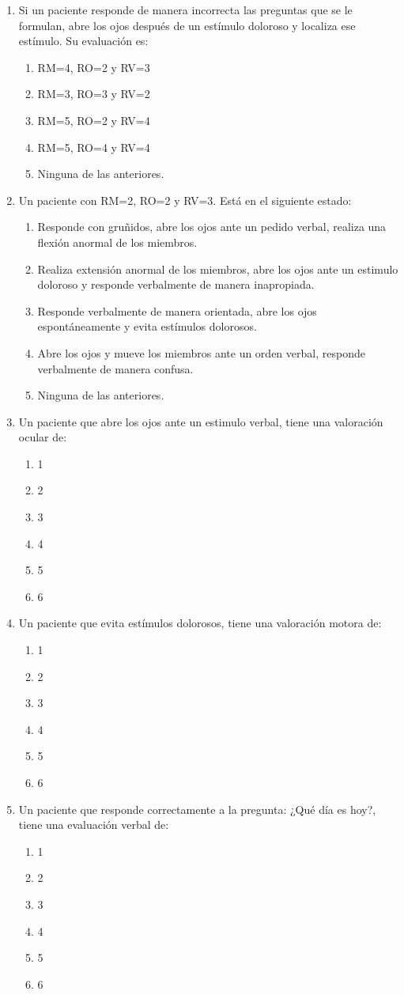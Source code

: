 \begin{enumerate}[label=\bfseries OG\arabic*.:]
\item Si un paciente responde de manera incorrecta las preguntas que se le
    formulan, abre los ojos después de un estímulo doloroso y localiza ese
    estímulo. Su evaluación es:
\begin{enumerate}
 \item RM=4, RO=2 y RV=3
 \item RM=3, RO=3 y RV=2
 \item RM=5, RO=2 y RV=4
 \item RM=5, RO=4 y RV=4
 \item Ninguna de las anteriores.
\end{enumerate}

\item Un paciente con RM=2, RO=2 y RV=3. Está en el siguiente estado:
\begin{enumerate}
 \item Responde con gruñidos, abre los ojos ante un pedido verbal, realiza una
     flexión anormal de los miembros.
 \item Realiza extensión anormal de los miembros, abre los ojos ante un estimulo
     doloroso y responde verbalmente de manera inapropiada.
 \item Responde verbalmente de manera orientada, abre los ojos espontáneamente y
     evita estímulos dolorosos.
 \item Abre los ojos y mueve los miembros ante un orden verbal, responde
     verbalmente de manera confusa.
 \item Ninguna de las anteriores.
\end{enumerate}
\item Un paciente que abre los ojos ante un estimulo verbal, tiene una
    valoración ocular de:
\begin{enumerate}
 \item 1
 \item 2
 \item 3
 \item 4
 \item 5
 \item 6
\end{enumerate}
\item Un paciente que evita estímulos dolorosos, tiene una valoración motora de:
\begin{enumerate}
 \item 1
 \item 2
 \item 3
 \item 4
 \item 5
 \item 6
\end{enumerate}

\item Un paciente que responde correctamente a la pregunta: ¿Qué día es hoy?,
    tiene una evaluación verbal de:
\begin{enumerate}
 \item 1
 \item 2
 \item 3
 \item 4
 \item 5
 \item 6
\end{enumerate}



\end{enumerate}
